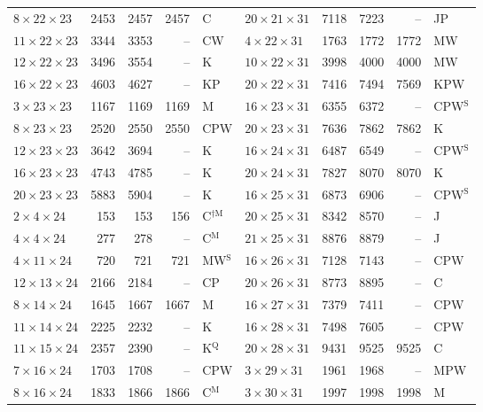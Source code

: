 \begin{longtable}{@{}lrrrl@{\hspace{6mm}}lrrrl@{}}
$8{\times}22{\times}23$ & 2453 & 2457 & 2457 & C & $20{\times}21{\times}31$ & 7118 & 7223 & -- & JP\\
$11{\times}22{\times}23$ & 3344 & 3353 & -- & CW & $4{\times}22{\times}31$ & 1763 & 1772 & 1772 & MW\\
$12{\times}22{\times}23$ & 3496 & 3554 & -- & K & $10{\times}22{\times}31$ & 3998 & 4000 & 4000 & MW\\
$16{\times}22{\times}23$ & 4603 & 4627 & -- & KP & $20{\times}22{\times}31$ & 7416 & 7494 & 7569 & KPW\\
$3{\times}23{\times}23$ & 1167 & 1169 & 1169 & M & $16{\times}23{\times}31$ & 6355 & 6372 & -- & CPW$^{\mathrm{S}}$\\
$8{\times}23{\times}23$ & 2520 & 2550 & 2550 & CPW & $20{\times}23{\times}31$ & 7636 & 7862 & 7862 & K\\
$12{\times}23{\times}23$ & 3642 & 3694 & -- & K & $16{\times}24{\times}31$ & 6487 & 6549 & -- & CPW$^{\mathrm{S}}$\\
$16{\times}23{\times}23$ & 4743 & 4785 & -- & K & $20{\times}24{\times}31$ & 7827 & 8070 & 8070 & K\\
$20{\times}23{\times}23$ & 5883 & 5904 & -- & K & $16{\times}25{\times}31$ & 6873 & 6906 & -- & CPW$^{\mathrm{S}}$\\
$2{\times}4{\times}24$ & 153 & 153 & 156 & C$^{\dagger\mathrm{M}}$ & $20{\times}25{\times}31$ & 8342 & 8570 & -- & J\\
$4{\times}4{\times}24$ & 277 & 278 & -- & C$^{\mathrm{M}}$ & $21{\times}25{\times}31$ & 8876 & 8879 & -- & J\\
$4{\times}11{\times}24$ & 720 & 721 & 721 & MW$^{\mathrm{S}}$ & $16{\times}26{\times}31$ & 7128 & 7143 & -- & CPW\\
$12{\times}13{\times}24$ & 2166 & 2184 & -- & CP & $20{\times}26{\times}31$ & 8773 & 8895 & -- & C\\
$8{\times}14{\times}24$ & 1645 & 1667 & 1667 & M & $16{\times}27{\times}31$ & 7379 & 7411 & -- & CPW\\
$11{\times}14{\times}24$ & 2225 & 2232 & -- & K & $16{\times}28{\times}31$ & 7498 & 7605 & -- & CPW\\
$11{\times}15{\times}24$ & 2357 & 2390 & -- & K$^{\mathrm{Q}}$ & $20{\times}28{\times}31$ & 9431 & 9525 & 9525 & C\\
$7{\times}16{\times}24$ & 1703 & 1708 & -- & CPW & $3{\times}29{\times}31$ & 1961 & 1968 & -- & MPW\\
$8{\times}16{\times}24$ & 1833 & 1866 & 1866 & C$^{\mathrm{M}}$ & $3{\times}30{\times}31$ & 1997 & 1998 & 1998 & M\\

\end{longtable}
